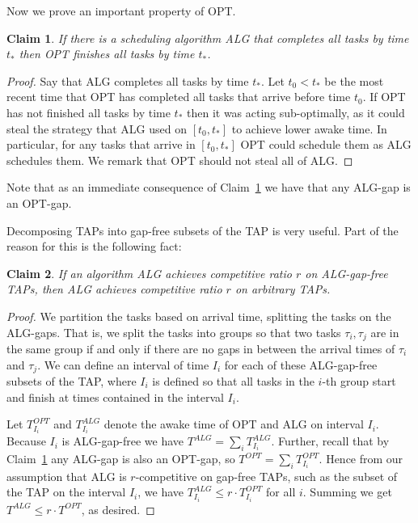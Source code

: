 \documentclass[twocolumn]{article}[10pt]
\newtheorem{claim}{Claim}
\begin{document}
Now we prove an important property of OPT.
\begin{claim}
  \label{clm:OPT_finishes_first}
  If there is a scheduling algorithm ALG that completes all tasks by
  time $t_*$ then OPT finishes all tasks by time $t_*$.
\end{claim}
\begin{proof}
  Say that ALG completes all tasks by time $t_*$. Let $t_0 < t_*$
  be the most recent time that OPT has completed all tasks that
  arrive before time $t_0$. If OPT has not finished all tasks by
  time $t_*$ then it was acting sub-optimally, as it could steal
  the strategy that ALG used on $[t_0, t_*]$ to achieve lower
  awake time. In particular, for any tasks that arrive in $[t_0,
  t_*]$ OPT could schedule them as ALG schedules them. We remark
  that OPT should not steal all of ALG. 
\end{proof}
Note that as an immediate consequence of Claim~\ref{clm:OPT_finishes_first}
we have that any ALG-gap is an OPT-gap.

Decomposing TAPs into gap-free subsets of the TAP is very useful.
Part of the reason for this is the following fact:
\begin{claim}
  \label{clm:just_consider_gapless}
  If an algorithm ALG achieves competitive ratio $r$ on
  ALG-gap-free TAPs, then ALG achieves 
  competitive ratio $r$ on arbitrary TAPs.
\end{claim}
\begin{proof}
  We partition the tasks based on arrival time, splitting the
  tasks on the ALG-gaps. That is, we split the tasks into groups
  so that two tasks $\tau_i, \tau_j$ are in the same group if and
  only if there are no gaps in between the arrival times of
  $\tau_i$ and $\tau_j$.
  We can define an interval of time $I_i$ for each of these
  ALG-gap-free subsets of the TAP, where $I_i$ is defined so that
  all tasks in the $i$-th group start and finish at times
  contained in the interval $I_i$.

  Let $T_{I_i}^{OPT}$ and $T_{I_i}^{ALG}$ denote the awake time
  of OPT and ALG on interval $I_i$. Because $I_i$ is ALG-gap-free
  we have $T^{ALG} = \sum_{i} T^{ALG}_{I_i}$.
  Further, recall that by Claim~\ref{clm:OPT_finishes_first} any
  ALG-gap is also an OPT-gap, so
  $T^{OPT} = \sum_{i} T_{I_i}^{OPT}$. 
  Hence from our assumption that ALG is $r$-competitive on
  gap-free TAPs, such as the subset of the TAP on the interval
  $I_i$, we have $T_{I_i}^{ALG} \le r\cdot T_{I_i}^{OPT}$ for
  all $i$. Summing we get $T^{ALG} \le r\cdot T^{OPT}$, as desired.
  
\end{proof}
\end{document}
